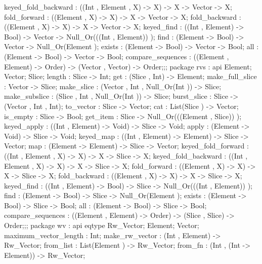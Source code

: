 {{                keyed_fold_backward : ((Int , Element , X) -> X) -> X -> Vector -> X;
                fold_forward : ((Element , X) -> X) -> X -> Vector -> X;
                fold_backward : ((Element , X) -> X) -> X -> Vector -> X;
                keyed_find : ((Int , Element) -> Bool) -> Vector -> Null_Or(((Int , Element)) );
                find : (Element -> Bool) -> Vector -> Null_Or(Element );
                exists : (Element -> Bool) -> Vector -> Bool;
                all : (Element -> Bool) -> Vector -> Bool;
                compare_sequences : ((Element , Element) -> Order) -> (Vector , Vector) -> Order;};;
        package rvs
          : api {
                Element;
                Vector;
                Slice;
                length : Slice -> Int;
                get : (Slice , Int) -> Element;
                make_full_slice : Vector -> Slice;
                make_slice : (Vector , Int , Null_Or(Int )) -> Slice;
                make_subslice : (Slice , Int , Null_Or(Int )) -> Slice;
                burst_slice : Slice -> (Vector , Int , Int);
                to_vector : Slice -> Vector;
                cat : List(Slice ) -> Vector;
                is_empty : Slice -> Bool;
                get_item : Slice -> Null_Or(((Element , Slice)) );
                keyed_apply : ((Int , Element) -> Void) -> Slice -> Void;
                apply : (Element -> Void) -> Slice -> Void;
                keyed_map : ((Int , Element) -> Element) -> Slice -> Vector;
                map : (Element -> Element) -> Slice -> Vector;
                keyed_fold_forward : ((Int , Element , X) -> X) -> X -> Slice -> X;
                keyed_fold_backward : ((Int , Element , X) -> X) -> X -> Slice -> X;
                fold_forward : ((Element , X) -> X) -> X -> Slice -> X;
                fold_backward : ((Element , X) -> X) -> X -> Slice -> X;
                keyed_find : ((Int , Element) -> Bool) -> Slice -> Null_Or(((Int , Element)) );
                find : (Element -> Bool) -> Slice -> Null_Or(Element );
                exists : (Element -> Bool) -> Slice -> Bool;
                all : (Element -> Bool) -> Slice -> Bool;
                compare_sequences : ((Element , Element) -> Order) -> (Slice , Slice) -> Order;};;
        package wv
          : api {
                eqtype Rw_Vector;
                Element;
                Vector;
                maximum_vector_length : Int;
                make_rw_vector : (Int , Element) -> Rw_Vector;
                from_list : List(Element ) -> Rw_Vector;
                from_fn : (Int , (Int -> Element)) -> Rw_Vector;
}}
